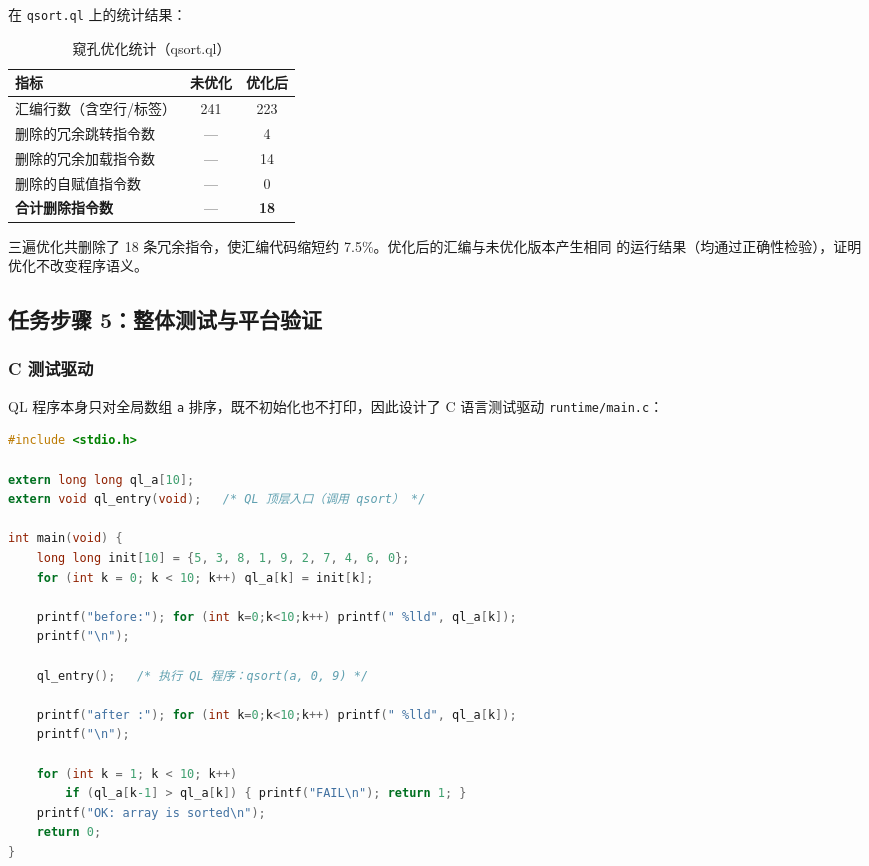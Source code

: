 \documentclass[12pt,a4paper]{ctexart}
\begin{document}
在 \texttt{qsort.ql} 上的统计结果：

\begin{table}[H]
\centering
\caption{窥孔优化统计（qsort.ql）}
\label{tab:opt}
\begin{tabular}{lcc}
\toprule
指标 & 未优化 & 优化后 \\
\midrule
汇编行数（含空行/标签）& 241 & 223 \\
删除的冗余跳转指令数   & —   & 4 \\
删除的冗余加载指令数   & —   & 14 \\
删除的自赋值指令数     & —   & 0 \\
\textbf{合计删除指令数} & —  & \textbf{18} \\
\bottomrule
\end{tabular}
\end{table}

三遍优化共删除了 18 条冗余指令，使汇编代码缩短约 7.5\%。优化后的汇编与未优化版本产生相同
的运行结果（均通过正确性检验），证明优化不改变程序语义。

\subsection{任务步骤 5：整体测试与平台验证}

\subsubsection{C 测试驱动}

QL 程序本身只对全局数组 \texttt{a} 排序，既不初始化也不打印，因此设计了 C 语言测试驱动
\texttt{runtime/main.c}：

\begin{lstlisting}[language=C, caption={runtime/main.c（测试驱动）}]
#include <stdio.h>

extern long long ql_a[10];
extern void ql_entry(void);   /* QL 顶层入口（调用 qsort） */

int main(void) {
    long long init[10] = {5, 3, 8, 1, 9, 2, 7, 4, 6, 0};
    for (int k = 0; k < 10; k++) ql_a[k] = init[k];

    printf("before:"); for (int k=0;k<10;k++) printf(" %lld", ql_a[k]);
    printf("\n");

    ql_entry();   /* 执行 QL 程序：qsort(a, 0, 9) */

    printf("after :"); for (int k=0;k<10;k++) printf(" %lld", ql_a[k]);
    printf("\n");

    for (int k = 1; k < 10; k++)
        if (ql_a[k-1] > ql_a[k]) { printf("FAIL\n"); return 1; }
    printf("OK: array is sorted\n");
    return 0;
}
\end{lstlisting}
\end{document}
